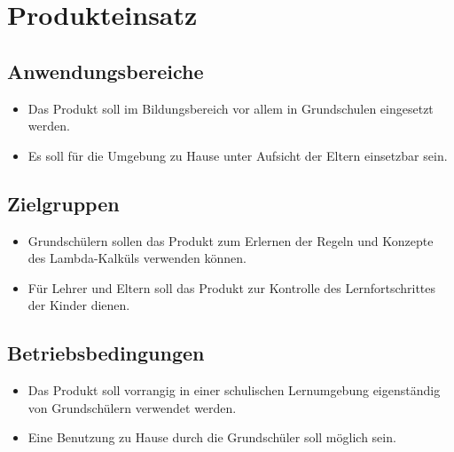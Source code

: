 \section{Produkteinsatz}

\subsection{Anwendungsbereiche}
\begin{itemize}
	\item Das Produkt soll im Bildungsbereich vor allem in Grundschulen eingesetzt werden.
	\item Es soll für die Umgebung zu Hause unter Aufsicht der Eltern einsetzbar sein.
\end{itemize}


\subsection{Zielgruppen}

\begin{itemize}
	\item Grundschülern sollen das Produkt zum Erlernen der Regeln und Konzepte des Lambda-Kalküls verwenden können.
	\item Für Lehrer und Eltern soll das Produkt zur Kontrolle des Lernfortschrittes der Kinder dienen.
\end{itemize}

\subsection{Betriebsbedingungen}
\begin{itemize}
	\item Das Produkt soll vorrangig  in einer schulischen Lernumgebung eigenständig von Grundschülern verwendet werden.
	\item Eine Benutzung zu Hause durch die Grundschüler soll möglich sein.
\end{itemize}
